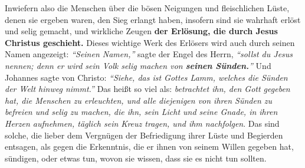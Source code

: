 Inwiefern also die Menschen über die bösen Neigungen und fleischlichen Lüste,
denen sie ergeben waren, den Sieg erlangt haben, insofern sind sie wahrhaft
erlöst und selig gemacht, und wirkliche Zeugen
\label{ref:01_10_jesus_der_erloeser}
\textbf{der Erlösung, die durch
Jesus Christus geschieht.}
Dieses wichtige Werk des Erlösers wird auch durch seinen Namen angezeigt:
\textit{"`Seinen Namen,"'} sagte der Engel des Herrn, \textit{"`sollst du Jesus
nennen; denn er wird sein Volk selig machen von \textbf{seinen
Sünden.}"'}
Und Johannes sagte von Christo:
\textit{"`Siehe, das ist Gottes Lamm, welches die Sünden der Welt hinweg nimmt."'}
Das heißt so viel als:
\textit{betrachtet ihn, den Gott gegeben hat, die Menschen zu erleuchten, und
alle diejenigen von ihren Sünden zu befreien und selig zu machen, die ihn, sein
Licht und seine Gnade, in ihren Herzen aufnehmen, täglich sein Kreuz tragen, und
ihm nachfolgen}.
Das sind solche, die lieber dem Vergnügen der Befriedigung ihrer Lüste und
Begierden entsagen, als gegen die Erkenntnis, die er ihnen von seinem Willen
gegeben hat, sündigen, oder etwas tun, wovon sie wissen, dass sie es nicht tun
sollten.







